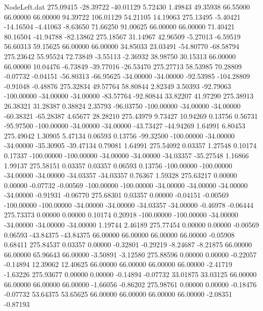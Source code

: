 \begin{filecontents}{NodeLeft.dat}
 275.09415  -28.39722  -40.01129     5.72430    1.49843   49.35938   66.55000   66.00000   66.00000   94.39722  106.01129   54.21105   14.19063
 275.13495   -5.40421  -14.16504    -4.41063   -8.63650   71.66250   91.00625   66.00000   66.00000   71.40421   80.16504  -41.94788  -82.13862
 275.18567   31.14967   42.96509    -5.27013   -6.59519   56.60313   59.15625   66.00000   66.00000   34.85033   23.03491  -54.80770  -68.58794
 275.23642   55.95524   72.73849    -3.55113   -2.36932   38.98750   30.15313   66.00000   66.00000   10.04476   -6.73849  -39.77016  -26.53470
 275.27713   58.53985   70.28809    -0.07732   -0.04151  -56.80313  -66.95625  -34.00000  -34.00000  -92.53985 -104.28809   -0.91048   -0.48876
 275.32834   49.57764   58.80844     2.82349    3.50393  -92.79063 -100.00000  -34.00000  -34.00000  -83.57764  -92.80844   33.82207   41.97290
 275.38913   26.38321   31.28387     0.38824    2.35793  -96.03750 -100.00000  -34.00000  -34.00000  -60.38321  -65.28387    4.65677   28.28210
 275.43979    9.73427   10.94269     0.13756    0.56731  -95.97500 -100.00000  -34.00000  -34.00000  -43.73427  -44.94269    1.64991    6.80453
 275.49042    1.30905    5.47134     0.06593    0.13756  -99.32500 -100.00000  -34.00000  -34.00000  -35.30905  -39.47134    0.79081    1.64991
 275.54092    0.03357    1.27548     0.10174    0.17337 -100.00000 -100.00000  -34.00000  -34.00000  -34.03357  -35.27548    1.16866    1.99137
 275.58151    0.03357    0.03357     0.06593    0.13756 -100.00000 -100.00000  -34.00000  -34.00000  -34.03357  -34.03357    0.76367    1.59328
 275.63217    0.00000    0.00000    -0.07732   -0.00569 -100.00000 -100.00000  -34.00000  -34.00000  -34.00000  -34.00000   -0.91931   -0.06770
 275.68301    0.03357    0.00000    -0.04151   -0.00569 -100.00000 -100.00000  -34.00000  -34.00000  -34.03357  -34.00000   -0.46978   -0.06444
 275.73373    0.00000    0.00000     0.10174    0.20918 -100.00000 -100.00000  -34.00000  -34.00000  -34.00000  -34.00000    1.19744    2.46189
 275.77454    0.00000    0.00000    -0.00569    0.06593  -43.84375  -43.84375   66.00000   66.00000   66.00000   66.00000   -0.05908    0.68411
 275.84537    0.03357    0.00000    -0.32801   -0.29219   -8.24687   -8.21875   66.00000   66.00000   65.96643   66.00000   -3.50891   -3.12580
 275.88596    0.00000    0.00000    -0.22057   -0.14894   12.39062   12.40625   66.00000   66.00000   66.00000   66.00000   -2.41719   -1.63226
 275.93677    0.00000    0.00000    -0.14894   -0.07732   33.01875   33.03125   66.00000   66.00000   66.00000   66.00000   -1.66056   -0.86202
 275.98761    0.00000    0.00000    -0.18476   -0.07732   53.64375   53.65625   66.00000   66.00000   66.00000   66.00000   -2.08351   -0.87193

\end{filecontents}
